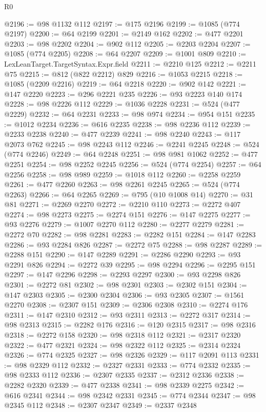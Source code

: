 \begin{lexlean}{R0}
\begin{coremodule}
@2196 := @98 @1132 @112
@2197 := @175 @2196
@2199 := @1085 (@774 @2197)
@2200 := @64 @2199
@2201 := @2149 @162
@2202 := @477 @2201
@2203 := @98 @2202
@2204 := @902 @112
@2205 := @2203 @2204
@2207 := @1085 (@774 @2205)
@2208 := @64 @2207
@2209 := @1001 @809
@2210 := LexLeanTarget.TargetSyntax.Expr.field
@2211 := @2210 @125
@2212 := @2211 @75
@2215 := @812 (@822 @2212) @829
@2216 := @1053 @2215
@2218 := @1085 (@2209 @2216)
@2219 := @64 @2218
@2220 := @902 @142
@2221 := @147 @2220
@2223 := @296 @2221 @235
@2226 := @93 @2223 @140 @174
@2228 := @98 @2226 @112
@2229 := @1036 @2228
@2231 := @524 (@477 @2229)
@2232 := @64 @2231
@2233 := @98 @974
@2234 := @954 @151
@2235 := @1012 @2234
@2236 := @616 @2235
@2238 := @98 @2236 @112
@2239 := @2233 @2238
@2240 := @477 @2239
@2241 := @98 @2240
@2243 := @117 @2073 @762
@2245 := @98 @2243 @112
@2246 := @2241 @2245
@2248 := @524 (@774 @2246)
@2249 := @64 @2248
@2251 := @98 @981 @1062
@2252 := @477 @2251
@2254 := @98 @2252 @2245
@2256 := @524 (@774 @2254)
@2257 := @64 @2256
@2258 := @98 @989
@2259 := @1018 @112
@2260 := @2258 @2259
@2261 := @477 @2260
@2263 := @98 @2261 @2245
@2265 := @524 (@774 @2263)
@2266 := @64 @2265
@2269 := @795 (@10 @1008 @14)
@2270 := @31 @81
@2271 := @2269 @2270
@2272 := @2210 @110
@2273 := @2272 @407
@2274 := @98 @2273
@2275 := @2274 @151
@2276 := @147 @2275
@2277 := @93 @2276
@2279 := @1007 @2270 @112
@2280 := @2277 @2279
@2281 := @2272 @70
@2282 := @98 @2281
@2283 := @2282 @151
@2284 := @147 @2283
@2286 := @93 @2284 @826
@2287 := @2272 @75
@2288 := @98 @2287
@2289 := @2288 @151
@2290 := @147 @2289
@2291 := @2286 @2290
@2293 := @93 @2291 @826
@2294 := @2272 @39
@2295 := @98 @2294
@2296 := @2295 @151
@2297 := @147 @2296
@2298 := @2293 @2297
@2300 := @93 @2298 @826
@2301 := @2272 @81
@2302 := @98 @2301
@2303 := @2302 @151
@2304 := @147 @2303
@2305 := @2300 @2304
@2306 := @93 @2305
@2307 := @1561 @2270
@2308 := @2307 @151
@2309 := @2306 @2308
@2310 := @2274 @176
@2311 := @147 @2310
@2312 := @93 @2311
@2313 := @2272 @317
@2314 := @98 @2313
@2315 := @2282 @176
@2316 := @120 @2315
@2317 := @98 @2316
@2318 := @2272 @158
@2320 := @98 @2318 @112
@2321 := @2317 @2320
@2322 := @477 @2321
@2324 := @98 @2322 @112
@2325 := @2314 @2324
@2326 := @774 @2325
@2327 := @98 @2326
@2329 := @117 @2091 @113
@2331 := @98 @2329 @112
@2332 := @2327 @2331
@2333 := @774 @2332
@2335 := @98 @2333 @112
@2336 := @2307 @2335
@2337 := @2312 @2336
@2338 := @2282 @2320
@2339 := @477 @2338
@2341 := @98 @2339 @2275
@2342 := @616 @2341
@2344 := @98 @2342 @2331
@2345 := @774 @2344
@2347 := @98 @2345 @112
@2348 := @2307 @2347
@2349 := @2337 @2348

\end{coremodule}
\end{lexlean}
